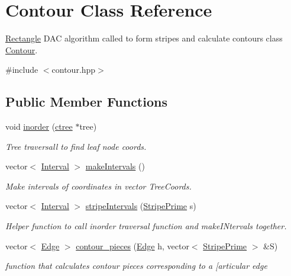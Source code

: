 \hypertarget{classContour}{}\section{Contour Class Reference}
\label{classContour}


\hyperlink{classRectangle}{Rectangle} D\+AC algorithm called to form stripes and calculate contours class \hyperlink{classContour}{Contour}.  




{\ttfamily \#include $<$contour.\+hpp$>$}

\subsection*{Public Member Functions}
\begin{DoxyCompactItemize}
\item 
void \hyperlink{classContour_acb911b734ef67fa1ce24ca437da7fc91}{inorder} (\hyperlink{classctree}{ctree} $\ast$tree)
\begin{DoxyCompactList}\small\item\em Tree traversall to find leaf node coords. \end{DoxyCompactList}\item 
vector$<$ \hyperlink{classInterval}{Interval} $>$ \hyperlink{classContour_a2b90717194f2c6a7506b7981302cfbcc}{make\+Intervals} ()
\begin{DoxyCompactList}\small\item\em Make intervals of coordinates in vector Tree\+Coords. \end{DoxyCompactList}\item 
vector$<$ \hyperlink{classInterval}{Interval} $>$ \hyperlink{classContour_aa22cbdbd91f5422225eb9508d4a7983a}{stripe\+Intervals} (\hyperlink{classStripePrime}{Stripe\+Prime} s)
\begin{DoxyCompactList}\small\item\em Helper function to call inorder traversal function and make\+I\+Ntervals together. \end{DoxyCompactList}\item 
vector$<$ \hyperlink{classEdge}{Edge} $>$ \hyperlink{classContour_a26b1f58c0345adaaec14bd7493d16ed2}{contour\+\_\+pieces} (\hyperlink{classEdge}{Edge} h, vector$<$ \hyperlink{classStripePrime}{Stripe\+Prime} $>$ \&S)
\begin{DoxyCompactList}\small\item\em function that calculates contour pieces corresponding to a \mbox{[}articular edge \end{DoxyCompactList}\item 

\end{DoxyCompactItemize}

